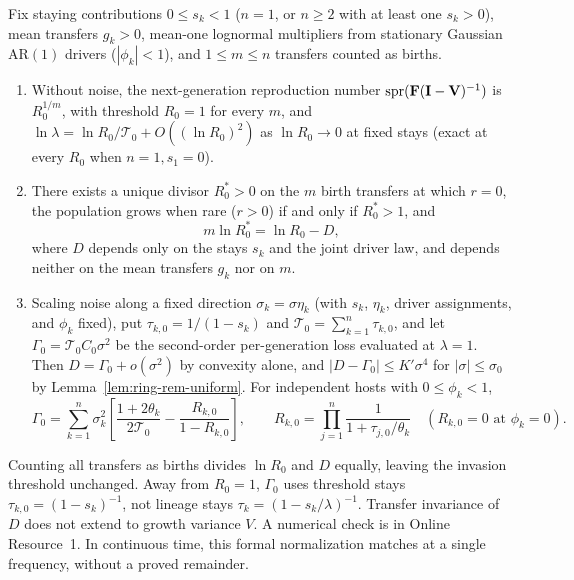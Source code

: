 \begin{proposition}\label{prop:bounds-r0star}
Fix staying contributions $0 \le s_k < 1$ ($n = 1$, or $n \ge 2$ with at least one $s_k > 0$), mean transfers $g_k > 0$, mean-one lognormal multipliers from stationary Gaussian $\mathrm{AR}(1)$ drivers ($|\phi_k| < 1$), and $1 \le m \le n$ transfers counted as births.
\begin{enumerate}
\item[(a)] Without noise, the next-generation reproduction number $\operatorname{spr}(\mathbf{F}(\mathbf{I} - \mathbf{V})^{-1})$ is $R_0^{1/m}$, with threshold $R_0 = 1$ for every $m$, and $\ln\lambda = \ln R_0 / \mathcal{T}_0 + O((\ln R_0)^2)$ as $\ln R_0 \to 0$ at fixed stays (exact at every $R_0$ when $n = 1, s_1 = 0$).
\item[(b)] There exists a unique divisor $R_0^* > 0$ on the $m$ birth transfers at which $r = 0$, the population grows when rare ($r > 0$) if and only if $R_0^* > 1$, and
\begin{equation}
m\ln R_0^* = \ln R_0 - D,
\label{eq:bounds-r0star}
\end{equation}
where $D$ depends only on the stays $s_k$ and the joint driver law, and depends neither on the mean transfers $g_k$ nor on $m$.
\item[(c)] Scaling noise along a fixed direction $\sigma_k = \sigma\eta_k$ (with $s_k$, $\eta_k$, driver assignments, and $\phi_k$ fixed), put $\tau_{k,0} = 1/(1 - s_k)$ and $\mathcal{T}_0 = \sum_{k=1}^n \tau_{k,0}$, and let $\Gamma_0 = \mathcal{T}_0 C_0 \sigma^2$ be the second-order per-generation loss evaluated at $\lambda = 1$. Then $D = \Gamma_0 + o(\sigma^2)$ by convexity alone, and $|D - \Gamma_0| \le K'\sigma^4$ for $|\sigma| \le \sigma_0$ by Lemma~\ref{lem:ring-rem-uniform}. For independent hosts with $0 \le \phi_k < 1$,
\begin{equation}
\Gamma_0 = \sum_{k=1}^n \sigma_k^2 \left[ \frac{1 + 2\theta_k}{2\mathcal{T}_0} - \frac{R_{k,0}}{1 - R_{k,0}} \right], \qquad R_{k,0} = \prod_{j=1}^n \frac{1}{1 + \tau_{j,0}/\theta_k} \quad (R_{k,0} = 0 \text{ at } \phi_k = 0).
\label{eq:bounds-gamma0}
\end{equation}
\end{enumerate}
\end{proposition}

Counting all transfers as births divides $\ln R_0$ and $D$ equally, leaving the invasion threshold unchanged. Away from $R_0 = 1$, $\Gamma_0$ uses threshold stays $\tau_{k,0} = (1 - s_k)^{-1}$, not lineage stays $\tau_k = (1 - s_k/\lambda)^{-1}$. Transfer invariance of $D$ does not extend to growth variance $V$. A numerical check is in Online Resource~1. In continuous time, this formal normalization matches \citet{bacaer2007} at a single frequency, without a proved remainder.


